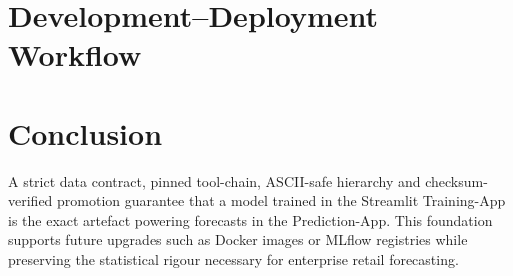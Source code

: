 \section{Development--Deployment Workflow}



\section{Conclusion}
A strict data contract, pinned tool-chain, ASCII-safe hierarchy and checksum-verified promotion guarantee that a model trained in the Streamlit Training-App is the exact artefact powering forecasts in the Prediction-App.  
This foundation supports future upgrades such as Docker images or MLflow registries while preserving the statistical rigour necessary for enterprise retail forecasting.
